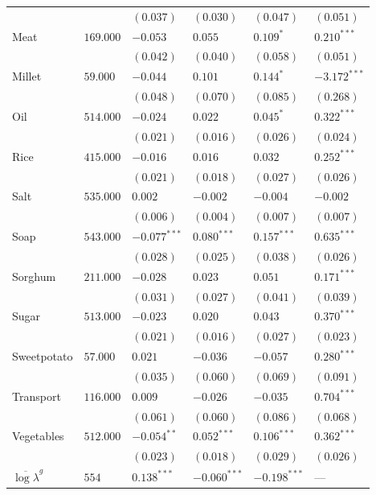 \documentclass[12pt,letterpaper]{article}
\begin{document}
\begin{table}[htb]
\begin{tabular}{llllll}
 &  & \((0.037)\) & \((0.030)\) & \((0.047)\) & \((0.051)\)\\
Meat & \(169.000\) & \(-0.053\) & \(0.055\) & \(0.109^{*}\) & \(0.210^{***}\)\\
 &  & \((0.042)\) & \((0.040)\) & \((0.058)\) & \((0.051)\)\\
Millet & \(59.000\) & \(-0.044\) & \(0.101\) & \(0.144^{*}\) & \(-3.172^{***}\)\\
 &  & \((0.048)\) & \((0.070)\) & \((0.085)\) & \((0.268)\)\\
Oil & \(514.000\) & \(-0.024\) & \(0.022\) & \(0.045^{*}\) & \(0.322^{***}\)\\
 &  & \((0.021)\) & \((0.016)\) & \((0.026)\) & \((0.024)\)\\
Rice & \(415.000\) & \(-0.016\) & \(0.016\) & \(0.032\) & \(0.252^{***}\)\\
 &  & \((0.021)\) & \((0.018)\) & \((0.027)\) & \((0.026)\)\\
Salt & \(535.000\) & \(0.002\) & \(-0.002\) & \(-0.004\) & \(-0.002\)\\
 &  & \((0.006)\) & \((0.004)\) & \((0.007)\) & \((0.007)\)\\
Soap & \(543.000\) & \(-0.077^{***}\) & \(0.080^{***}\) & \(0.157^{***}\) & \(0.635^{***}\)\\
 &  & \((0.028)\) & \((0.025)\) & \((0.038)\) & \((0.026)\)\\
Sorghum & \(211.000\) & \(-0.028\) & \(0.023\) & \(0.051\) & \(0.171^{***}\)\\
 &  & \((0.031)\) & \((0.027)\) & \((0.041)\) & \((0.039)\)\\
Sugar & \(513.000\) & \(-0.023\) & \(0.020\) & \(0.043\) & \(0.370^{***}\)\\
 &  & \((0.021)\) & \((0.016)\) & \((0.027)\) & \((0.023)\)\\
Sweetpotato & \(57.000\) & \(0.021\) & \(-0.036\) & \(-0.057\) & \(0.280^{***}\)\\
 &  & \((0.035)\) & \((0.060)\) & \((0.069)\) & \((0.091)\)\\
Transport & \(116.000\) & \(0.009\) & \(-0.026\) & \(-0.035\) & \(0.704^{***}\)\\
 &  & \((0.061)\) & \((0.060)\) & \((0.086)\) & \((0.068)\)\\
Vegetables & \(512.000\) & \(-0.054^{**}\) & \(0.052^{***}\) & \(0.106^{***}\) & \(0.362^{***}\)\\
 &  & \((0.023)\) & \((0.018)\) & \((0.029)\) & \((0.026)\)\\
\hline
\(\overline{\log\lambda}^g\) & \(554\) & \(0.138^{***}\) & \(-0.060^{***}\) & \(-0.198^{***}\) & ---\\
\end{tabular}
\end{table}
\end{document}
